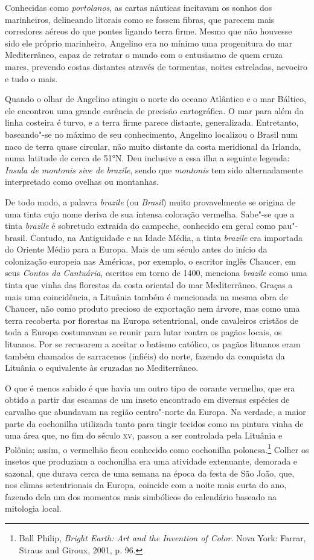 Conhecidas como \textit{portolanos}, as cartas náuticas
incitavam os sonhos dos marinheiros, delineando litorais como se fossem
fibras, que parecem mais corredores aéreos do que pontes ligando terra
firme. Mesmo que não houvesse sido ele próprio marinheiro, Angelino era
no mínimo uma progenitura do mar Mediterrâneo, capaz de retratar o mundo
com o entusiasmo de quem cruza mares, prevendo costas distantes através
de tormentas, noites estreladas, nevoeiro e tudo o mais. 

Quando o olhar
de Angelino atingiu o norte do oceano Atlântico e o mar Báltico, ele
encontrou uma grande carência de precisão cartográfica. O mar para além
da linha costeira é turvo, e a terra firme parece distante,
generalizada. Entretanto, baseando"-se no máximo de seu conhecimento,
Angelino localizou o Brasil num naco de terra quase circular, não muito
distante da costa meridional da Irlanda, numa latitude de cerca de 51°N.
Deu inclusive a essa ilha a seguinte legenda: \textit{Insula de montonis
sive de brazile}, sendo que \textit{montonis} tem sido alternadamente
interpretado como ovelhas ou montanhas.

De todo modo, a palavra \textit{brazile} (ou \textit{Brasil}) muito
provavelmente se origina de uma tinta cujo nome deriva de sua intensa
coloração vermelha. Sabe"-se que a tinta \textit{brazile} é sobretudo
extraída do campeche, conhecido em geral como pau"-brasil. Contudo, na
Antiguidade e na Idade Média, a tinta \textit{brazile} era importada do
Oriente Médio para a Europa. Mais de um século antes do início da
colonização europeia nas Américas, por exemplo, o escritor inglês
Chaucer, em seus \textit{Contos da Cantuária}, escritos em torno de 1400,
menciona \textit{brazile} como uma tinta que vinha das florestas da costa
oriental do mar Mediterrâneo. Graças a mais uma coincidência, a Lituânia
também é mencionada na mesma obra de Chaucer, não como produto precioso
de exportação nem árvore, mas como uma terra recoberta por florestas na
Europa setentrional, onde cavaleiros cristãos de toda a Europa
costumavam se reunir para lutar contra os pagãos locais, os lituanos.
Por se recusarem a aceitar o batismo católico, os pagãos lituanos eram
também chamados de sarracenos (infiéis) do norte, fazendo da conquista
da Lituânia o equivalente às cruzadas no Mediterrâneo. 

O que é menos
sabido é que havia um outro tipo de corante vermelho, que era obtido a
partir das escamas de um inseto encontrado em diversas espécies de
carvalho que abundavam na região centro"-norte da Europa. Na verdade, a
maior parte da cochonilha utilizada tanto para tingir tecidos como na
pintura vinha de uma área que, no fim do século \textsc{xv}, passou a ser
controlada pela Lituânia e Polônia; assim, o vermelhão ficou conhecido
como cochonilha polonesa.\footnote{Ball Philip, \textit{Bright Earth:
  Art and the Invention of Color}. Nova York: Farrar, Straus and Giroux,
  2001, p. 96.} Colher os insetos que produziam a cochonilha era uma
atividade extenuante, demorada e sazonal, que durava cerca de uma semana
na época da festa de São João, que, nos climas setentrionais da Europa,
coincide com a noite mais curta do ano, fazendo dela um dos momentos
mais simbólicos do calendário baseado na mitologia local. 

